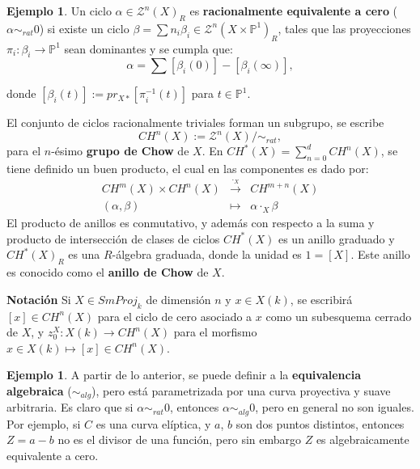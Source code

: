 \documentclass[10pt]{amsart}
\theoremstyle{definition}
\theoremstyle{remark}
\theoremstyle{definition}
\newtheorem{ejem}[definition]{Ejemplo}
\begin{document}
\begin{ejem}
Un ciclo $\alpha \in \mathcal{Z}^{n}(X)_{R}$ es \textbf{racionalmente equivalente a cero} ($\alpha\sim_{rat} 0$) si existe un ciclo $\beta=\sum n_{i}\beta_{i} \in \mathcal{Z}^{n}(X \times \mathbb{P}^1)_{R}$, tales que las proyecciones $\pi_{i}: \beta_{i} \rightarrow \mathbb{P}^1$ sean dominantes y se cumpla que:
\begin{equation*}
\alpha=\sum [\beta_{i}(0)]-[\beta_{i}(\infty)],
\end{equation*}

donde $[\beta_{i}(t)]:=pr_{X*}[\pi^{-1}_{i}(t)]$ para $t \in \mathbb{P}^1$.

El conjunto de ciclos racionalmente triviales forman un subgrupo, se escribe
\begin{equation*}
CH^{n}(X):=\mathcal{Z}^{n}(X)/\sim_{rat},
\end{equation*}
para el $n$-ésimo \textbf{grupo de Chow} de $X$. En $CH^{*}(X)=\sum^{d}_{n=0} CH^{n}(X)$, se tiene definido un buen producto, el cual en las componentes es dado por:
\[
\begin{array}{ccc}
CH^m(X) \times CH^n(X) & \xrightarrow{\cdot_X} & CH^{m+n}(X) \\
(\alpha, \beta) & \longmapsto & \alpha \cdot_X \beta
\end{array}
\]
El producto de anillos es conmutativo, y además con respecto a la suma y producto de intersección de clases de ciclos $CH^{*}(X)$ es un anillo graduado y $CH^{*}(X)_{R}$ es una $R$-álgebra graduada, donde la unidad es $1=[X]$. Este anillo es conocido como el \textbf{anillo de Chow} de $X$. 
\end{ejem}

\textbf{Notación} Si $X\in SmProj_{k}$ de dimensión $n$ y $x\in X(k)$, se escribirá $[x]\in CH^{n}(X)$ para el ciclo de cero asociado a $x$ como un subesquema cerrado de $X$, y $z_{0}^{X}:X(k)\to CH^{n}(X)$ para el morfismo $x\in X(k)\mapsto[x]\in CH^{n}(X)$.

\begin{ejem} A partir de lo anterior, se puede definir a la \textbf{equivalencia algebraica} ($\sim_{alg}$), pero está parametrizada por una curva proyectiva y suave arbitraria. Es claro que si $\alpha \sim_{rat} 0$, entonces $\alpha \sim_{alg} 0$, pero en general no son iguales. Por ejemplo, si $C$ es una curva elíptica, y $a$, $b$ son dos puntos distintos, entonces $Z=a-b$ no es el divisor de una función, pero sin embargo $Z$ es algebraicamente equivalente a cero.
\end{ejem}
\end{document}
